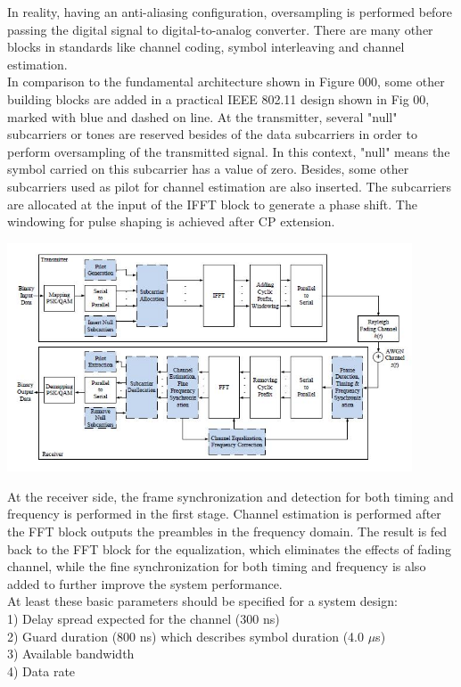 In reality, having an anti-aliasing configuration, oversampling is performed before passing the digital signal to digital-to-analog converter. There are many other blocks in standards like channel coding, symbol interleaving and channel estimation.\\
In comparison to the fundamental architecture shown in Figure 000, some other building blocks are added in a practical IEEE 802.11 design shown in Fig 00, marked with blue and dashed on line. At the transmitter, several "null" subcarriers or tones are reserved besides of the data subcarriers in order to perform oversampling of the transmitted signal. In this context, "null" means the symbol carried on this subcarrier has a value of zero. Besides, some other subcarriers used as pilot for channel estimation are also inserted. The subcarriers are allocated at the input of the IFFT block to generate a phase shift. The windowing for pulse shaping is achieved after CP extension.\\

\begin{center}
\includegraphics[width=12cm]{content/fig/ieee_system_design.JPG}
\end{center}

At the receiver side, the frame synchronization and detection for both timing and frequency is performed in the first stage. Channel estimation is performed after the FFT block outputs the preambles in the frequency domain. The result is fed back to the FFT block for the equalization, which eliminates the effects of fading channel, while the fine synchronization for both timing and frequency is also added to further improve the system performance.\\
At least these basic parameters should be specified for a system design:\\
1) Delay spread expected for the channel (300 ns)\\
2) Guard duration (800 ns) which describes symbol duration (4.0 $\mu$s)\\
3) Available bandwidth\\
4) Data rate\\

